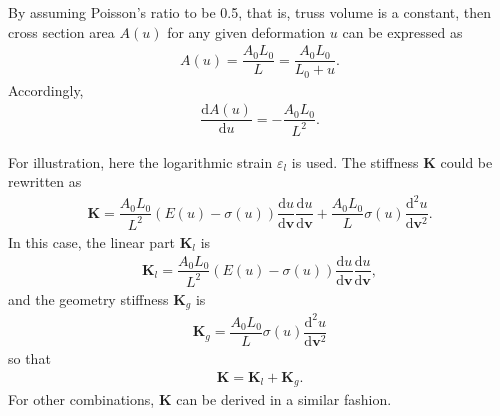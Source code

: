 \documentclass[11pt]{article}
\begin{document}
By assuming Poisson's ratio to be \num{0.5}, that is, truss volume is a constant, then cross section area $A(u)$ for any given deformation $u$ can be expressed as
\begin{gather}
A(u)=\dfrac{A_0L_0}{L}=\dfrac{A_0L_0}{L_0+u}.
\end{gather}
Accordingly,
\begin{gather}
\dfrac{\mathrm{d}A(u)}{\mathrm{d}u}=-\dfrac{A_0L_0}{L^2}.
\end{gather}

For illustration, here the logarithmic strain $\varepsilon_l$ is used. The stiffness $\mathbf{K}$ could be rewritten as
\begin{gather}
\mathbf{K}=\dfrac{A_0L_0}{L^2}\left(E(u)-\sigma(u)\right)\dfrac{\mathrm{d}u}{\mathrm{d}\mathbf{v}}\dfrac{\mathrm{d}u}{\mathrm{d}\mathbf{v}}+\dfrac{A_0L_0}{L}\sigma(u)\dfrac{\mathrm{d}^2u}{\mathrm{d}\mathbf{v}^2}.
\end{gather}
In this case, the linear part $\mathbf{K}_l$ is
\begin{gather}
\mathbf{K}_l=\dfrac{A_0L_0}{L^2}\left(E(u)-\sigma(u)\right)\dfrac{\mathrm{d}u}{\mathrm{d}\mathbf{v}}\dfrac{\mathrm{d}u}{\mathrm{d}\mathbf{v}},
\end{gather}
and the geometry stiffness $\mathbf{K}_g$ is
\begin{gather}
\mathbf{K}_g=\dfrac{A_0L_0}{L}\sigma(u)\dfrac{\mathrm{d}^2u}{\mathrm{d}\mathbf{v}^2}
\end{gather}
so that
\begin{gather}
\mathbf{K}=\mathbf{K}_l+\mathbf{K}_g.
\end{gather}
For other combinations, $\mathbf{K}$ can be derived in a similar fashion.
\end{document}
